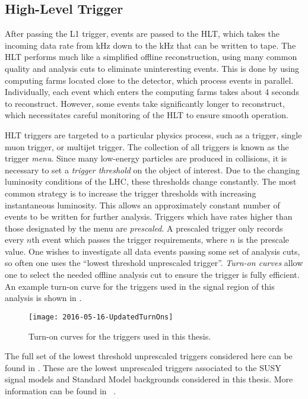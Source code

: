 \subsection{High-Level Trigger}

After passing the L1 trigger, events are passed to the HLT, which takes the incoming data rate from  kHz down to the  kHz that can be written to tape.
The HLT performs much like a simplified offline reconstruction, using many common quality and analysis cuts to eliminate uninteresting events.
This is done by using computing farms located close to the detector, which process events in parallel.
Individually, each event which enters the computing farms takes about 4 seconds to reconstruct.
However, some events take significantly longer to reconstruct, which necessitates careful monitoring of the HLT to ensure smooth operation.

HLT triggers are targeted to a particular physics process, such as a \met trigger, single muon trigger, or multijet trigger.
The collection of all triggers is known as the trigger \textit{menu}.
Since many low-energy particles are produced in collisions, it is necessary to set a \textit{trigger threshold} on the object of interest.
Due to the changing luminosity conditions of the LHC, these thresholds change constantly.
The most common strategy is to increase the trigger thresholds with increasing instantaneous luminosity.
This allows an approximately constant number of events to be written for further analysis.
Triggers which have rates higher than those designated by the menu are \textit{prescaled}.
A prescaled trigger only records every $n$th event which passes the trigger requirements, where $n$ is the prescale value.
One wishes to investigate all data events passing some set of analysis cuts, so often one uses the ``lowest threshold unprescaled trigger''.
\textit{Turn-on curves} allow one to select the needed offline analysis cut to ensure the trigger is fully efficient.
An example turn-on curve for the \met triggers used in the signal region of this analysis is shown in .
\begin{figure}[tbp]
\caption{Turn-on curves for the \met triggers used in this thesis.} \label{fig:met_turnon}
\texttt{[image: 2016-05-16-UpdatedTurnOns]}
\end{figure}

The full set of the lowest threshold unprescaled triggers considered here can be found in .
These are the lowest unprescaled triggers associated to the SUSY signal models and Standard Model backgrounds considered in this thesis.
More information can be found in ~\cite{ATL-DAQ-PUB-2016-001}.

